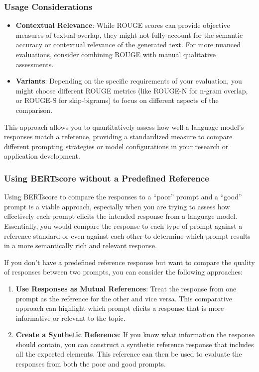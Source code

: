\documentclass[
]{agujournal2019}
\providecommand{\tightlist}{%
  \setlength{\itemsep}{0pt}\setlength{\parskip}{0pt}}\usepackage{longtable,booktabs,array}
\begin{document}
\subsubsection{Usage Considerations}\label{usage-considerations}

\begin{itemize}
\tightlist
\item
  \textbf{Contextual Relevance}: While ROUGE scores can provide
  objective measures of textual overlap, they might not fully account
  for the semantic accuracy or contextual relevance of the generated
  text. For more nuanced evaluations, consider combining ROUGE with
  manual qualitative assessments.
\item
  \textbf{Variants}: Depending on the specific requirements of your
  evaluation, you might choose different ROUGE metrics (like ROUGE-N for
  n-gram overlap, or ROUGE-S for skip-bigrams) to focus on different
  aspects of the comparison.
\end{itemize}

This approach allows you to quantitatively assess how well a language
model's responses match a reference, providing a standardized measure to
compare different prompting strategies or model configurations in your
research or application development.

\subsubsection{Using BERTscore without a Predefined
Reference}\label{using-bertscore-without-a-predefined-reference}

Using BERTscore to compare the responses to a ``poor'' prompt and a
``good'' prompt is a viable approach, especially when you are trying to
assess how effectively each prompt elicits the intended response from a
language model. Essentially, you would compare the response to each type
of prompt against a reference standard or even against each other to
determine which prompt results in a more semantically rich and relevant
response.

If you don't have a predefined reference response but want to compare
the quality of responses between two prompts, you can consider the
following approaches:

\begin{enumerate}
\def\labelenumi{\arabic{enumi}.}
\item
  \textbf{Use Responses as Mutual References}: Treat the response from
  one prompt as the reference for the other and vice versa. This
  comparative approach can highlight which prompt elicits a response
  that is more informative or relevant to the topic.
\item
  \textbf{Create a Synthetic Reference}: If you know what information
  the response should contain, you can construct a synthetic reference
  response that includes all the expected elements. This reference can
  then be used to evaluate the responses from both the poor and good
  prompts.
\end{enumerate}
\end{document}
